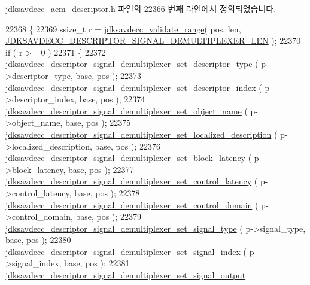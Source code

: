 jdksavdecc\+\_\+aem\+\_\+descriptor.\+h 파일의 22366 번째 라인에서 정의되었습니다.


\begin{DoxyCode}
22368 \{
22369     ssize\_t r = \hyperlink{group__util_ga9c02bdfe76c69163647c3196db7a73a1}{jdksavdecc\_validate\_range}( pos, len, 
      \hyperlink{group__descriptor__signal__demultiplexer_ga359e8ecd2c1c5ab25eb590c5dc3998ad}{JDKSAVDECC\_DESCRIPTOR\_SIGNAL\_DEMULTIPLEXER\_LEN} );
22370     \textcolor{keywordflow}{if} ( r >= 0 )
22371     \{
22372         \hyperlink{group__descriptor__signal__demultiplexer_gaec58a550645eef272d4541a62570ed9f}{jdksavdecc\_descriptor\_signal\_demultiplexer\_set\_descriptor\_type}
      ( p->descriptor\_type, base, pos );
22373         \hyperlink{group__descriptor__signal__demultiplexer_gab930fff90c1625f1f4eee9370251f454}{jdksavdecc\_descriptor\_signal\_demultiplexer\_set\_descriptor\_index}
      ( p->descriptor\_index, base, pos );
22374         \hyperlink{group__descriptor__signal__demultiplexer_ga676992214d561b95303b013389ae86d4}{jdksavdecc\_descriptor\_signal\_demultiplexer\_set\_object\_name}
      ( p->object\_name, base, pos );
22375         \hyperlink{group__descriptor__signal__demultiplexer_ga7c17fd30254b67bef7c447764b761c3c}{jdksavdecc\_descriptor\_signal\_demultiplexer\_set\_localized\_description}
      ( p->localized\_description, base, pos );
22376         \hyperlink{group__descriptor__signal__demultiplexer_ga0f3b4797ca3ea60a013a86db93ccf69f}{jdksavdecc\_descriptor\_signal\_demultiplexer\_set\_block\_latency}
      ( p->block\_latency, base, pos );
22377         \hyperlink{group__descriptor__signal__demultiplexer_ga995dc35c5c1805f4ca53c5c1dec27cdf}{jdksavdecc\_descriptor\_signal\_demultiplexer\_set\_control\_latency}
      ( p->control\_latency, base, pos );
22378         \hyperlink{group__descriptor__signal__demultiplexer_ga34df93148694894967b3538164ea4a50}{jdksavdecc\_descriptor\_signal\_demultiplexer\_set\_control\_domain}
      ( p->control\_domain, base, pos );
22379         \hyperlink{group__descriptor__signal__demultiplexer_ga92c10f7f8dc049b48f5de23dd903d5dc}{jdksavdecc\_descriptor\_signal\_demultiplexer\_set\_signal\_type}
      ( p->signal\_type, base, pos );
22380         \hyperlink{group__descriptor__signal__demultiplexer_ga4d86725f2692b11395791cad4f1ae8c6}{jdksavdecc\_descriptor\_signal\_demultiplexer\_set\_signal\_index}
      ( p->signal\_index, base, pos );
22381         \hyperlink{group__descriptor__signal__demultiplexer_ga1cd79217b69bd9478e7b77708a34c09a}{jdksavdecc\_descriptor\_signal\_demultiplexer\_set\_signal\_output}

\end{DoxyCode}
